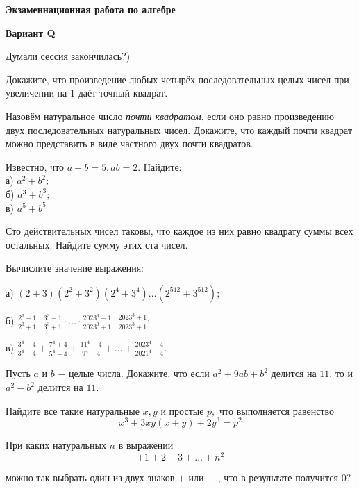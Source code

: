 \centerline{\bf \Huge Экзаменнационная работа по алгебре}
\centerline{\bf \Huge Вариант Q}

\begin{flushright}
        \scriptsize{Думали сессия закончилась?)}
\end{flushright}

Докажите, что произведение любых четырёх последовательных целых чисел при увеличении на 1 даёт точный квадрат.

Назовём натуральное число \textit{почти квадратом}, если оно равно произведению двух последовательных натуральных чисел. Докажите, что каждый почти квадрат можно представить в виде частного двух почти квадратов.

Известно, что $a+b=5, ab=2.$ Найдите:\\
а) $a^2 + b^2;$\\
б) $a^3 + b^3;$\\
в) $a^5 + b^5$

Сто действительных чисел таковы, что каждое из них равно квадрату суммы всех остальных. Найдите сумму этих ста чисел.

Вычислите значение выражения:

а) \((2 + 3)(2^2 + 3^2)(2^4 + 3^4) \ldots (2^{512} + 3^{512})\);

б) $\frac{2^3 - 1}{2^3 + 1} \cdot \frac{3^3 - 1}{3^3 + 1} \cdot \ldots \cdot \frac{2023^3 - 1}{2023^3 + 1} \cdot \frac{2023^3 + 1}{2023^3 + 1}$;

в) \(\frac{3^4 + 4}{3^4 - 4} + \frac{7^4 + 4}{5^4 - 4} + \frac{11^4 + 4}{9^4 - 4} + \ldots + \frac{2023^4 + 4}{2021^4 + 4}\).

Пусть $a$ и $b$ $-$ целые числа. Докажите, что если $a^2+9ab+b^2$ делится на
$11$, то и $a^2-b^2$ делится на $11$.

Найдите все такие натуральные $x, y$ и простые $p,$ что выполняется
равенство
\[x^3 + 3xy(x+y) + 2y^3 = p^2 \]

При каких натуральных $n$ в выражении
\[\pm 1 \pm 2 \pm 3 \pm \ldots \pm n^2\]

можно так выбрать один из двух знаков $+$ или $ - $ , что в результате получится $0$?   

